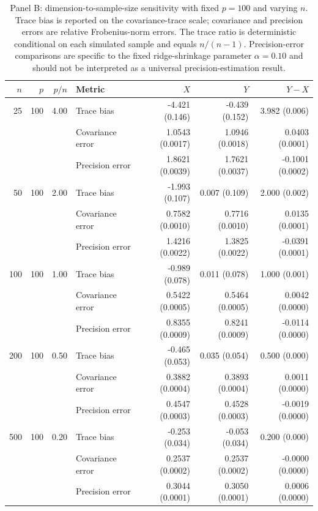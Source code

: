 \begin{table}[htbp]
\centering
\scriptsize
\caption{Panel B: dimension-to-sample-size sensitivity with fixed $p=100$ and varying $n$. Trace bias is reported on the covariance-trace scale; covariance and precision errors are relative Frobenius-norm errors. The trace ratio is deterministic conditional on each simulated sample and equals $n/(n-1)$. Precision-error comparisons are specific to the fixed ridge-shrinkage parameter $\alpha=0.10$ and should not be interpreted as a universal precision-estimation result.}
\label{tab:pn_sensitivity_fixed_p}
\begin{tabular}{rrrlrrr}
\hline\hline
\textbf{$n$} & \textbf{$p$} & \textbf{$p/n$} & \textbf{Metric} & \textbf{$X$} & \textbf{$Y$} & \textbf{$Y-X$} \\
\hline
25 & 100 & 4.00 & Trace bias & -4.421 (0.146) & -0.439 (0.152) & 3.982 (0.006) \\
 &  &  & Covariance error & 1.0543 (0.0017) & 1.0946 (0.0018) & 0.0403 (0.0001) \\
 &  &  & Precision error & 1.8621 (0.0039) & 1.7621 (0.0037) & -0.1001 (0.0002) \\
\hline
50 & 100 & 2.00 & Trace bias & -1.993 (0.107) & 0.007 (0.109) & 2.000 (0.002) \\
 &  &  & Covariance error & 0.7582 (0.0010) & 0.7716 (0.0010) & 0.0135 (0.0001) \\
 &  &  & Precision error & 1.4216 (0.0022) & 1.3825 (0.0022) & -0.0391 (0.0001) \\
\hline
100 & 100 & 1.00 & Trace bias & -0.989 (0.078) & 0.011 (0.078) & 1.000 (0.001) \\
 &  &  & Covariance error & 0.5422 (0.0005) & 0.5464 (0.0005) & 0.0042 (0.0000) \\
 &  &  & Precision error & 0.8355 (0.0009) & 0.8241 (0.0009) & -0.0114 (0.0000) \\
\hline
200 & 100 & 0.50 & Trace bias & -0.465 (0.053) & 0.035 (0.054) & 0.500 (0.000) \\
 &  &  & Covariance error & 0.3882 (0.0004) & 0.3893 (0.0004) & 0.0011 (0.0000) \\
 &  &  & Precision error & 0.4547 (0.0003) & 0.4528 (0.0003) & -0.0019 (0.0000) \\
\hline
500 & 100 & 0.20 & Trace bias & -0.253 (0.034) & -0.053 (0.034) & 0.200 (0.000) \\
 &  &  & Covariance error & 0.2537 (0.0002) & 0.2537 (0.0002) & -0.0000 (0.0000) \\
 &  &  & Precision error & 0.3044 (0.0001) & 0.3050 (0.0001) & 0.0006 (0.0000) \\
\hline\hline
\end{tabular}
\end{table}

